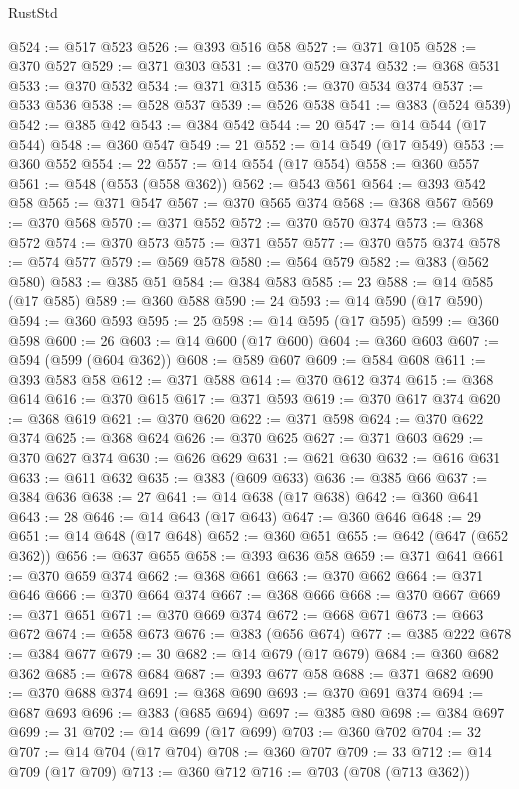 \begin{lexlean}{RustStd}
\begin{coremodule}
@524 := @517 @523
@526 := @393 @516 @58
@527 := @371 @105
@528 := @370 @527
@529 := @371 @303
@531 := @370 @529 @374
@532 := @368 @531
@533 := @370 @532
@534 := @371 @315
@536 := @370 @534 @374
@537 := @533 @536
@538 := @528 @537
@539 := @526 @538
@541 := @383 (@524 @539)
@542 := @385 @42
@543 := @384 @542
@544 := 20
@547 := @14 @544 (@17 @544)
@548 := @360 @547
@549 := 21
@552 := @14 @549 (@17 @549)
@553 := @360 @552
@554 := 22
@557 := @14 @554 (@17 @554)
@558 := @360 @557
@561 := @548 (@553 (@558 @362))
@562 := @543 @561
@564 := @393 @542 @58
@565 := @371 @547
@567 := @370 @565 @374
@568 := @368 @567
@569 := @370 @568
@570 := @371 @552
@572 := @370 @570 @374
@573 := @368 @572
@574 := @370 @573
@575 := @371 @557
@577 := @370 @575 @374
@578 := @574 @577
@579 := @569 @578
@580 := @564 @579
@582 := @383 (@562 @580)
@583 := @385 @51
@584 := @384 @583
@585 := 23
@588 := @14 @585 (@17 @585)
@589 := @360 @588
@590 := 24
@593 := @14 @590 (@17 @590)
@594 := @360 @593
@595 := 25
@598 := @14 @595 (@17 @595)
@599 := @360 @598
@600 := 26
@603 := @14 @600 (@17 @600)
@604 := @360 @603
@607 := @594 (@599 (@604 @362))
@608 := @589 @607
@609 := @584 @608
@611 := @393 @583 @58
@612 := @371 @588
@614 := @370 @612 @374
@615 := @368 @614
@616 := @370 @615
@617 := @371 @593
@619 := @370 @617 @374
@620 := @368 @619
@621 := @370 @620
@622 := @371 @598
@624 := @370 @622 @374
@625 := @368 @624
@626 := @370 @625
@627 := @371 @603
@629 := @370 @627 @374
@630 := @626 @629
@631 := @621 @630
@632 := @616 @631
@633 := @611 @632
@635 := @383 (@609 @633)
@636 := @385 @66
@637 := @384 @636
@638 := 27
@641 := @14 @638 (@17 @638)
@642 := @360 @641
@643 := 28
@646 := @14 @643 (@17 @643)
@647 := @360 @646
@648 := 29
@651 := @14 @648 (@17 @648)
@652 := @360 @651
@655 := @642 (@647 (@652 @362))
@656 := @637 @655
@658 := @393 @636 @58
@659 := @371 @641
@661 := @370 @659 @374
@662 := @368 @661
@663 := @370 @662
@664 := @371 @646
@666 := @370 @664 @374
@667 := @368 @666
@668 := @370 @667
@669 := @371 @651
@671 := @370 @669 @374
@672 := @668 @671
@673 := @663 @672
@674 := @658 @673
@676 := @383 (@656 @674)
@677 := @385 @222
@678 := @384 @677
@679 := 30
@682 := @14 @679 (@17 @679)
@684 := @360 @682 @362
@685 := @678 @684
@687 := @393 @677 @58
@688 := @371 @682
@690 := @370 @688 @374
@691 := @368 @690
@693 := @370 @691 @374
@694 := @687 @693
@696 := @383 (@685 @694)
@697 := @385 @80
@698 := @384 @697
@699 := 31
@702 := @14 @699 (@17 @699)
@703 := @360 @702
@704 := 32
@707 := @14 @704 (@17 @704)
@708 := @360 @707
@709 := 33
@712 := @14 @709 (@17 @709)
@713 := @360 @712
@716 := @703 (@708 (@713 @362))

\end{coremodule}
\end{lexlean}
